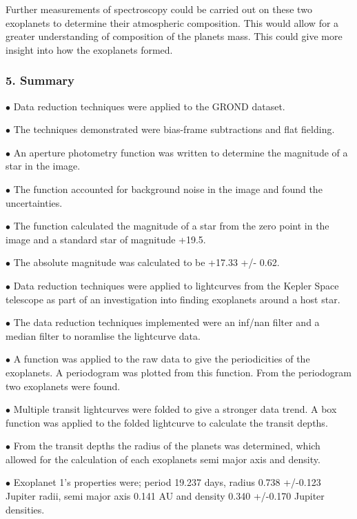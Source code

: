 \documentclass[11pt]{article}
\begin{document}
Further measurements of spectroscopy could be carried out on these two
exoplanets to determine their atmospheric composition. This would allow
for a greater understanding of composition of the planets mass. This
could give more insight into how the exoplanets formed.

    \subsubsection{5. Summary}\label{summary}

\(\bullet\) Data reduction techniques were applied to the GROND dataset.

\(\bullet\) The techniques demonstrated were bias-frame subtractions and
flat fielding.

\(\bullet\) An aperture photometry function was written to determine the
magnitude of a star in the image.

\(\bullet\) The function accounted for background noise in the image and
found the uncertainties.

\(\bullet\) The function calculated the magnitude of a star from the
zero point in the image and a standard star of magnitude +19.5.

\(\bullet\) The absolute magnitude was calculated to be +17.33 +/- 0.62.

\(\bullet\) Data reduction techniques were applied to lightcurves from
the Kepler Space telescope as part of an investigation into finding
exoplanets around a host star.

\(\bullet\) The data reduction techniques implemented were an inf/nan
filter and a median filter to noramlise the lightcurve data.

\(\bullet\) A function was applied to the raw data to give the
periodicities of the exoplanets. A periodogram was plotted from this
function. From the periodogram two exoplanets were found.

\(\bullet\) Multiple transit lightcurves were folded to give a stronger
data trend. A box function was applied to the folded lightcurve to
calculate the transit depths.

\(\bullet\) From the transit depths the radius of the planets was
determined, which allowed for the calculation of each exoplanets semi
major axis and density.

\(\bullet\) Exoplanet 1's properties were; period 19.237 days, radius
0.738 +/-0.123 Jupiter radii, semi major axis 0.141 AU and density 0.340
+/-0.170 Jupiter densities.
\end{document}
